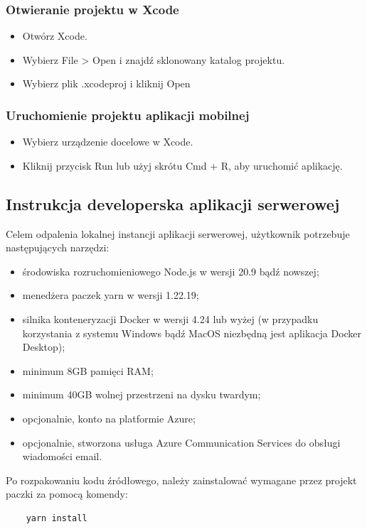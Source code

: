\documentclass[12pt, a4paper, twoside, openany]{book}
\newcommand{\forceindent}{\leavevmode{\parindent=1.3em\indent}}
\begin{document}
\subsubsection{Otwieranie projektu w Xcode }
\begin{itemize}[label=--]
    \item Otwórz Xcode.
    \item Wybierz File > Open i znajdź sklonowany katalog projektu.
    \item Wybierz plik .xcodeproj i kliknij Open
\end{itemize}

\subsubsection{Uruchomienie projektu aplikacji mobilnej}
\begin{itemize}
    \item Wybierz urządzenie docelowe w Xcode.
    \item Kliknij przycisk Run lub użyj skrótu Cmd + R, aby uruchomić aplikację.
\end{itemize}

\subsection{Instrukcja developerska aplikacji serwerowej}

\forceindent Celem odpalenia lokalnej instancji aplikacji serwerowej, użytkownik potrzebuje następujących narzędzi:
\begin{itemize}[label=--]
    \item środowiska rozruchomieniowego Node.js w wersji 20.9 bądź nowszej;
    \item menedżera paczek yarn w wersji 1.22.19;
    \item silnika konteneryzacji Docker w wersji 4.24 lub wyżej (w przypadku korzystania z systemu Windows bądź MacOS niezbędną jest aplikacja Docker Desktop);
    \item minimum 8GB pamięci RAM;
    \item minimum 40GB wolnej przestrzeni na dysku twardym;
    \item opcjonalnie, konto na platformie Azure;
    \item opcjonalnie, stworzona usługa Azure Communication Services do obsługi wiadomości email.
\end{itemize}

Po rozpakowaniu kodu źródłowego, należy zainstalować wymagane przez projekt paczki za pomocą komendy:
\begin{lstlisting}
    yarn install
\end{lstlisting}
\end{document}
